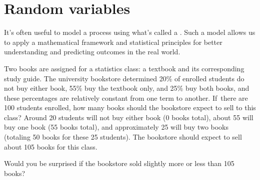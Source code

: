 {\setlength{\eoceAfterSpace}{2mm}}





\section{Random variables}
\label{randomVariablesSection}


\noindent%
It's often useful to model a process using what's
called a .
Such a model allows us to apply a mathematical
framework and statistical principles for
better understanding and predicting outcomes
in the real world.

\begin{examplewrap}
\begin{nexample}{Two books are assigned for a statistics class: a textbook and its corresponding study guide. The university bookstore determined 20\% of enrolled students do not buy either book, 55\% buy the textbook only, and 25\% buy both books, and these percentages are relatively constant from one term to another. If~there are 100 students enrolled, how many books should the bookstore expect to sell to this class?}\label{bookStoreSales}
Around 20 students will not buy either book (0 books total), about 55 will buy one book (55 books total), and approximately 25 will buy two books (totaling 50 books for these 25 students). The bookstore should expect to sell about 105 books for this class.
\end{nexample}
\end{examplewrap}

\begin{exercisewrap}
\begin{nexercise}
Would you be surprised if the bookstore sold slightly more or less than 105 books?\footnotemark
\end{nexercise}
\end{exercisewrap}

